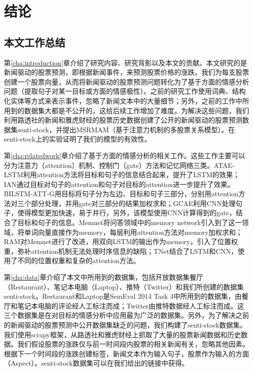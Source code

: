 \chapter{结论}
\label{cha:conclusion}

\section{本文工作总结}

第\ref{cha:introduction}章介绍了研究内容、研究背影以及本文的贡献。本文研究的是新闻驱动的股票预测，即根据新闻事件，来预测股票价格的涨跌。我们为每支股票创建一个股票向量，从而将新闻驱动的股票预测问题转化为了基于方面的情感分析问题（提取句子对某一目标或方面的情感极性）。之前的研究工作使用词典、结构化实体等方式来表示事件，忽略了新闻文本中的大量细节；另外，之前的工作中所用到的数据集大都是不公开的，这给后续工作增加了难度。为解决这些问题，我们利用路透社的新闻和雅虎财经的股票历史数据创建了公开的新闻驱动的股票预测数据集senti-stock，并提出MSRMAM（基于注意力机制的多股票关系模型）。在senti-stock上的实验证明了我们的模型的有效性。

第\ref{cha:relatedwork}章介绍了基于方面的情感分析的相关工作。这些工作主要可以分为注意力（attention）机制、控制门（gate）方法和记忆网络三类。ATAE-LSTM利用attention方法将目标和句子的信息结合起来，提升了LSTM的效果；IAN通过目标对句子的attention和句子对目标的attention进一步提升了效果。BILSTM-ATT-G用目标将句子分为左边、目标和句子三部分，分别用attention方法对三个部分处理，并用gate对三部分的结果加权求和；GCAE利用CNN处理句子，使得模型更加快速，易于并行，另外，该模型使用CNN计算得到的gate，结合了目标和句子的信息。Memnet将问答领域中的memory network引入到了这一领域，将单词向量直接作为memory，每层利用attention方法对memory加权求和；RAM对Memnet进行了改进，用双向LSTM的输出作为memory，引入了位置权重，弥补attention机制无法处理时序信息的缺陷；TNet结合了LSTM和CNN，使用了不同的位置权重和复杂的attention方法。

第\ref{cha:data}章介绍了本文中所用到的数据集，包括开放数据集餐厅（Restaurant）、笔记本电脑（Laptop）、推特（Twitter）和我们所创建的数据集senti-stock。Restaurant和Laptop是SemEval 2014 Task 4中所用到的数据集，由餐厅和笔记本电脑的评论经人工标注而成；Twitter由推特数据经人工标注而成。这三个数据集是在对目标的情感分析中应用最为广泛的数据集。另外，为了解决之前的新闻驱动的股票预测中公开数据集缺乏的问题，我们构建了senti-stock数据集。我们使用scrapy框架，从路透社和雅虎财经上抓取了大量的股票新闻数据和历史数据。我们假设股票的涨跌仅与前一时间段内股票的相关新闻有关，忽略其他因素。根据下一个时间段的涨跌创建标签，新闻文本作为输入句子，股票作为输入的方面（Aspect）。senti-stock数据集可以在我们给出的链接中获得。

